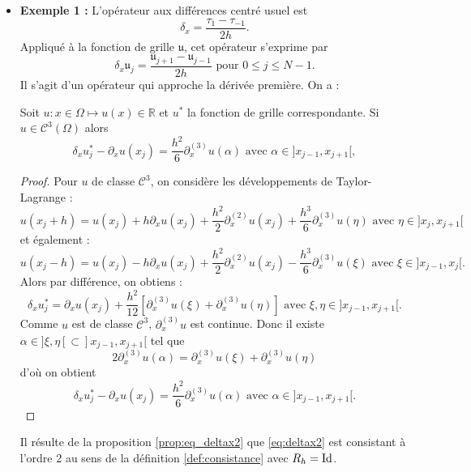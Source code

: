 \begin{itemize}
\item \textbf{Exemple 1 : }L'opérateur aux différences centré usuel est
\begin{equation}
\delta_x = \dfrac{\tau_1 - \tau_{-1}}{2h}.
\label{eq:deltax2}
\end{equation}
Appliqué à la fonction de grille $\mathfrak{u}$, cet opérateur s'exprime par 
\begin{equation}
\delta_x \mathfrak{u}_j = \dfrac{\mathfrak{u}_{j+1} - \mathfrak{u}_{j-1}}{2h} \text{ pour } 0 \leq j \leq N-1.
\end{equation}
Il s'agit d'un opérateur qui approche la dérivée première. On a :
\begin{proposition}
Soit $u: x \in \Omega \mapsto u(x) \in \mathbb{R}$ et $u^*$ la fonction de grille correspondante. Si $u \in \mathcal{C}^3 (\Omega)$ alors 
\begin{equation}
\delta_x u^*_j - \partial_x u(x_j) = \dfrac{h^2}{6} \partial_x^{(3)}u(\alpha) \text{ avec } \alpha \in ]x_{j-1}, x_{j+1}[,
\end{equation}
\label{prop:eq_deltax2}
\end{proposition}

\begin{proof}
Pour $u$ de classe $\mathcal{C}^3$, on considère les développements de Taylor-Lagrange :
\begin{equation}
u(x_j+h) = u(x_j) + h \partial_x u(x_j) + \dfrac{h^2}{2} \partial_x^{(2)} u(x_j) + \dfrac{h^3}{6} \partial_x^{(3)}u (\eta) \text{ avec } \eta \in ]x_j, x_{j+1}[
\end{equation}
et également :
\begin{equation}
u(x_j-h) = u(x_j) - h \partial_x u(x_j) + \dfrac{h^2}{2} \partial_x^{(2)} u(x_j) - \dfrac{h^3}{6} \partial_x^{(3)} u(\xi) \text{ avec } \xi \in ]x_{j-1}, x_{j}[.
\end{equation}
Alors par différence, on obtiens : 
\begin{equation}
\delta_x u^*_j = \partial_x u(x_j) + \dfrac{h^2}{12} \left[ \partial_x^{(3)} u(\xi) + \partial_x^{(3)} u (\eta) \right]  \text{ avec } \xi, \eta \in ]x_{j-1}, x_{j+1}[.
\end{equation}
Comme $u$ est de classe $\mathcal{C}^{3}$, $\partial_x^{(3)}u$ est continue. Donc il existe $\alpha \in ]\xi, \eta[ \subset ]x_{j-1}, x_{j+1}[$ tel que
\begin{equation}
2 \partial_x^{(3)}u(\alpha) = \partial_x^{(3)} u(\xi) + \partial_x^{(3)} u (\eta)
\end{equation}
d'où on obtient 
\begin{equation}
\delta_x u^*_j - \partial_x u(x_j) = \dfrac{h^2}{6} \partial_x^{(3)}u(\alpha) \text{ avec } \alpha \in ]x_{j-1}, x_{j+1}[.
\end{equation}
\end{proof}
Il résulte de la proposition \ref{prop:eq_deltax2} que \eqref{eq:deltax2} est consistant à l'ordre 2 au sens de la définition \ref{def:consistance} avec $R_h = \text{Id}$.




\end{itemize}
